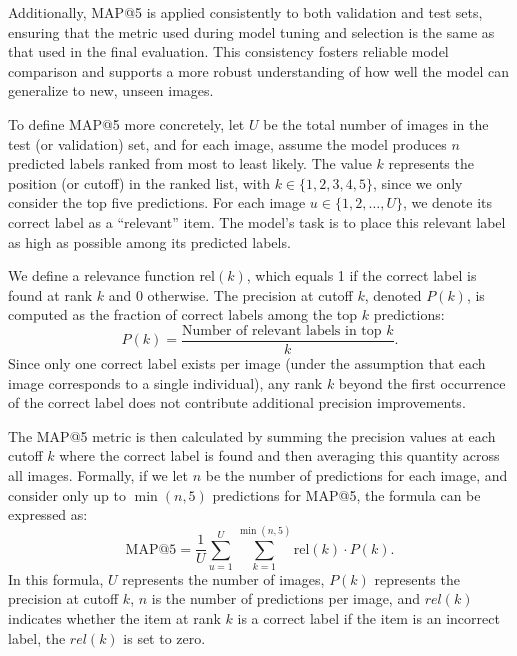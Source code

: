 \documentclass[twocolumn]{article}
\begin{document}
Additionally, MAP@5 is applied consistently to both validation and test sets, ensuring that the metric used during model tuning and selection is the same as that used in the final evaluation. This consistency fosters reliable model comparison and supports a more robust understanding of how well the model can generalize to new, unseen images.

To define MAP@5 more concretely, let \( U \) be the total number of images in the test (or validation) set, and for each image, assume the model produces \( n \) predicted labels ranked from most to least likely. The value \( k \) represents the position (or cutoff) in the ranked list, with \( k \in \{1, 2, 3, 4, 5\} \), since we only consider the top five predictions. For each image \( u \in \{1, 2, \ldots, U\} \), we denote its correct label as a “relevant” item. The model’s task is to place this relevant label as high as possible among its predicted labels. 

We define a relevance function \( \text{rel}(k) \), which equals 1 if the correct label is found at rank \( k \) and 0 otherwise. The precision at cutoff \( k \), denoted \( P(k) \), is computed as the fraction of correct labels among the top \( k \) predictions:
\begin{equation*}
P(k) = \frac{\text{Number of relevant labels in top } k}{k}.
\end{equation*}
Since only one correct label exists per image (under the assumption that each image corresponds to a single individual), any rank \( k \) beyond the first occurrence of the correct label does not contribute additional precision improvements.

The MAP@5 metric is then calculated by summing the precision values at each cutoff \( k \) where the correct label is found and then averaging this quantity across all images. Formally, if we let \( n \) be the number of predictions for each image, and consider only up to \( \min(n, 5) \) predictions for MAP@5, the formula can be expressed as:
\begin{equation*}
\text{MAP@5} = \frac{1}{U} \sum_{u=1}^{U} \sum_{k=1}^{\min(n, 5)} \text{rel}(k) \cdot P(k).
\end{equation*}
In this formula, \(U\) represents the number of images, \(P(k)\) represents the precision at cutoff \(k\), \(n\) is the number of predictions per image, and \(rel(k)\) indicates whether the item at rank \(k\) is a correct label if the item is an incorrect label, the \(rel(k)\) is set to zero.
\end{document}
